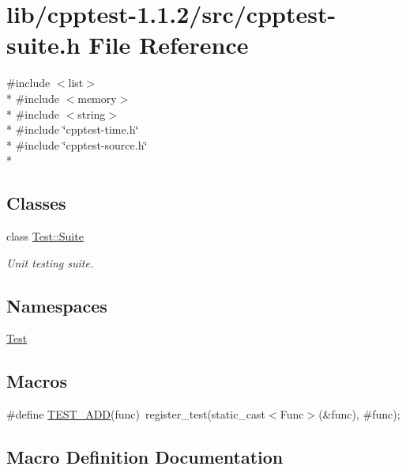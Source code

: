 \hypertarget{cpptest-suite_8h}{}\section{lib/cpptest-\/1.1.2/src/cpptest-\/suite.h File Reference}
\label{cpptest-suite_8h}
{\ttfamily \#include $<$list$>$}\\*
{\ttfamily \#include $<$memory$>$}\\*
{\ttfamily \#include $<$string$>$}\\*
{\ttfamily \#include \char`\"{}cpptest-\/time.\+h\char`\"{}}\\*
{\ttfamily \#include \char`\"{}cpptest-\/source.\+h\char`\"{}}\\*
\subsection*{Classes}
\begin{DoxyCompactItemize}
\item 
class \hyperlink{class_test_1_1_suite}{Test\+::\+Suite}
\begin{DoxyCompactList}\small\item\em Unit testing suite. \end{DoxyCompactList}\end{DoxyCompactItemize}
\subsection*{Namespaces}
\begin{DoxyCompactItemize}
\item 
 \hyperlink{namespace_test}{Test}
\end{DoxyCompactItemize}
\subsection*{Macros}
\begin{DoxyCompactItemize}
\item 
\#define \hyperlink{cpptest-suite_8h_abe8c3e0a2cf3893ebc1c265264ed9cb8}{T\+E\+S\+T\+\_\+\+A\+DD}(func)~register\+\_\+test(static\+\_\+cast$<$Func$>$(\&func), \#func);
\end{DoxyCompactItemize}


\subsection{Macro Definition Documentation}

